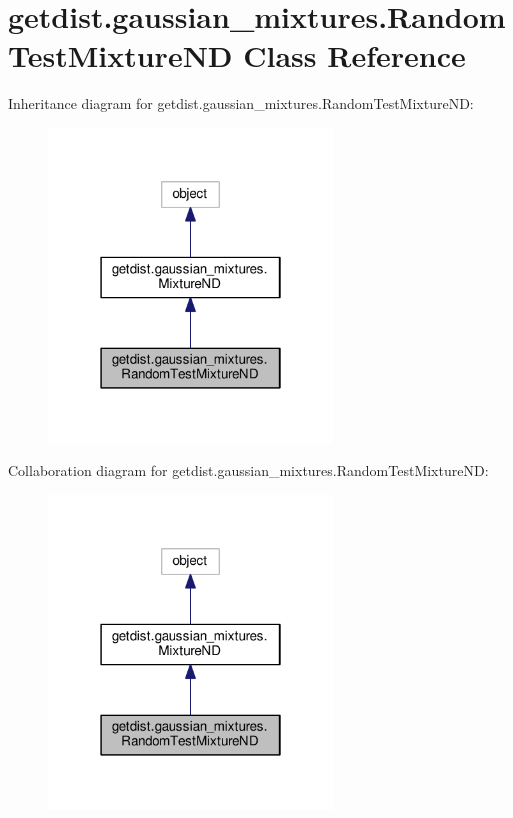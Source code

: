 \hypertarget{classgetdist_1_1gaussian__mixtures_1_1RandomTestMixtureND}{}\section{getdist.\+gaussian\+\_\+mixtures.\+Random\+Test\+Mixture\+ND Class Reference}
\label{classgetdist_1_1gaussian__mixtures_1_1RandomTestMixtureND}


Inheritance diagram for getdist.\+gaussian\+\_\+mixtures.\+Random\+Test\+Mixture\+ND\+:
\nopagebreak
\begin{figure}[H]
\begin{center}
\leavevmode
\includegraphics[width=214pt]{classgetdist_1_1gaussian__mixtures_1_1RandomTestMixtureND__inherit__graph}
\end{center}
\end{figure}


Collaboration diagram for getdist.\+gaussian\+\_\+mixtures.\+Random\+Test\+Mixture\+ND\+:
\nopagebreak
\begin{figure}[H]
\begin{center}
\leavevmode
\includegraphics[width=214pt]{classgetdist_1_1gaussian__mixtures_1_1RandomTestMixtureND__coll__graph}
\end{center}
\end{figure}
